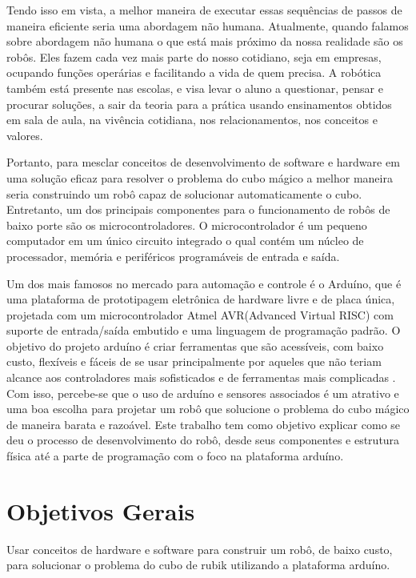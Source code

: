     Tendo isso em vista, a melhor maneira de executar essas sequências de passos de maneira eficiente seria uma abordagem não humana. Atualmente, quando falamos sobre abordagem não humana o que está mais próximo da nossa realidade são os robôs. Eles fazem cada vez mais parte do nosso cotidiano, seja em empresas, ocupando funções operárias e  facilitando a vida de quem precisa. A robótica também está presente nas escolas, e visa levar o aluno a questionar, pensar e procurar soluções, a sair da teoria para a prática usando ensinamentos obtidos em sala de aula, na vivência cotidiana, nos relacionamentos, nos conceitos e valores.

    Portanto, para mesclar conceitos de desenvolvimento de software e hardware em  uma solução eficaz para resolver o problema do cubo mágico a melhor maneira seria construindo um robô capaz de solucionar automaticamente o cubo. Entretanto, um dos principais componentes para o funcionamento de robôs de baixo porte são os microcontroladores.  O microcontrolador é um pequeno computador em um único circuito integrado o qual contém um núcleo de processador, memória e periféricos programáveis de entrada e saída. \cite{controlador}


    Um dos mais famosos no mercado para automação e controle  é o Arduíno, que  é uma plataforma de prototipagem eletrônica de hardware livre e de placa única, projetada com um microcontrolador Atmel AVR(Advanced Virtual RISC)  com suporte de entrada/saída embutido e uma linguagem de programação padrão. O objetivo do projeto arduíno é criar ferramentas que são acessíveis, com baixo custo, flexíveis e fáceis de se usar principalmente por aqueles que não teriam alcance aos controladores mais sofisticados e de ferramentas mais complicadas \cite{arduinowiki}. Com isso, percebe-se que o uso de arduíno e sensores associados é um atrativo e uma boa escolha para projetar um robô que solucione o problema do cubo mágico de maneira barata e razoável. Este trabalho tem como objetivo explicar como se deu o processo de desenvolvimento do robô, desde seus componentes e estrutura física até a  parte de programação com o foco na plataforma arduíno. 


\section{Objetivos Gerais}

Usar conceitos de hardware e software para construir um robô, de baixo custo, para solucionar o problema do cubo de rubik utilizando a plataforma arduíno.


